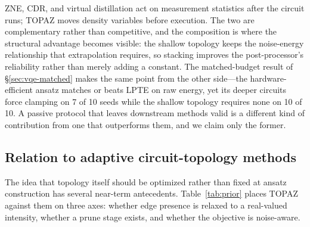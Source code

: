 \documentclass[twocolumn,aps,prl,superscriptaddress,showkeys]{revtex4-2}
\theoremstyle{plain}
\theoremstyle{definition}
\begin{document}
ZNE, CDR, and virtual distillation act on measurement statistics after the circuit runs; TOPAZ moves density variables before execution. The two are complementary rather than competitive, and the composition is where the structural advantage becomes visible: the shallow topology keeps the noise-energy relationship that extrapolation requires, so stacking improves the post-processor's reliability rather than merely adding a constant. The matched-budget result of \S\ref{sec:vqe-matched} makes the same point from the other side---the hardware-efficient ansatz matches or beats LPTE on raw energy, yet its deeper circuits force clamping on 7 of 10 seeds while the shallow topology requires none on 10 of 10. A passive protocol that leaves downstream methods valid is a different kind of contribution from one that outperforms them, and we claim only the former.

\subsection{Relation to adaptive circuit-topology methods}

The idea that topology itself should be optimized rather than fixed at ansatz construction has several near-term antecedents. Table~\ref{tab:prior} places TOPAZ against them on three axes: whether edge presence is relaxed to a real-valued intensity, whether a prune stage exists, and whether the objective is noise-aware.

\begin{table}[htbp]
\centering
\caption{Positioning TOPAZ against prior approaches that adapt circuit structure. ``Continuous'': edge presence is relaxed to a real-valued intensity during optimization. ``Prune stage'': unused operators or edges are removed at some point in the pipeline.}
\label{tab:prior}
\end{table}
\end{document}
